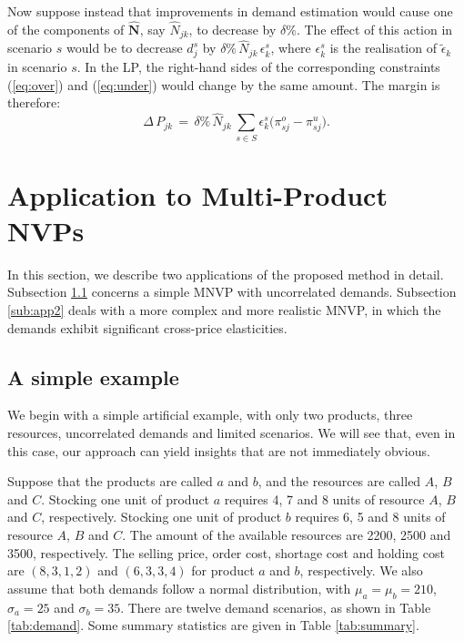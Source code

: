 \documentclass[a4paper,11pt]{article}
\begin{document}
Now suppose instead that improvements in demand estimation would cause one
of the components of $\mathbf{\hat{N}}$, say $\hat{N}_{jk}$, to decrease by
$\delta \%$. The effect of this action in scenario $s$ would be to decrease
$d_j^s$ by $\delta \% \, \hat{N}_{jk} \, \epsilon_k^s$, where $\epsilon_k^s$
is the realisation of $\tilde{\epsilon}_k$ in scenario $s$. In the LP, the
right-hand sides of the corresponding constraints (\ref{eq:over}) and
(\ref{eq:under}) would change by the same amount. The margin is therefore:
\[
\Delta \, P_{jk} \, = \, \delta \% \, \hat{N}_{jk} \,
\sum_{s \in S} \epsilon_k^s \big(\pi_{sj}^o - \pi_{sj}^u \big).
\]

\section{Application to Multi-Product NVPs}
\label{se:application}

In this section, we describe two applications of the proposed method in
detail. Subsection \ref{sub:app1} concerns a simple MNVP with uncorrelated
demands. Subsection \ref{sub:app2} deals with a more complex and more
realistic MNVP, in which the demands exhibit significant cross-price
elasticities.

\subsection{A simple example}
\label{sub:app1}

We begin with a simple artificial example, with only two products, three
resources, uncorrelated demands and limited scenarios. We will see that, even in this case, our approach can yield insights that are not immediately obvious.

Suppose that the products are called $a$ and $b$, and the resources are
called $A$, $B$ and $C$. Stocking one unit of product $a$ requires 4, 7 and
8 units of resource $A$, $B$ and $C$, respectively. Stocking one unit of
product $b$ requires 6, 5 and 8 units of resource $A$, $B$ and $C$. The
amount of the available resources are 2200, 2500 and 3500, respectively.
The selling price, order cost, shortage cost and holding cost are
$(8,3,1,2)$ and $(6,3,3,4)$ for product $a$ and $b$, respectively. We also assume that both demands follow a normal distribution, with $\mu_a = \mu_b =210$, $\sigma_a = 25$ and $\sigma_b = 35$. There
are twelve demand scenarios, as shown in Table \ref{tab:demand}. Some
summary statistics are given in Table \ref{tab:summary}.
\end{document}
